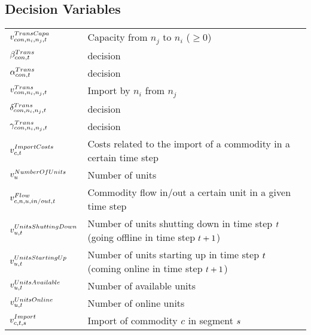 \subsection*{Decision Variables}
\vspace{-1em}
	\begin{longtable}{p{\cola} p{\colc} >{\small\raggedleft\arraybackslash\itshape}p{\colb}}
		$v^{TransCapa}_{{con},n_i,n_j,t}     $	& Capacity from $n_j$ to $n_i$  ($\geq 0$)                              	&                \\
		$\beta^{Trans}_{{con},t}            $	& decision                                                    	&                \\
		$\alpha^{Trans}_{{con},t}            $	& decision                                                    	&                \\
		$v^{Trans}_{{con},n_i,n_j,t}        $	& Import by $n_i$ from $n_j$                                  	&                \\
		$\delta^{Trans}_{{con},n_i,n_j,t}            $	& decision                                                    	&                \\
		$\gamma^{Trans}_{{con},n_i,n_j,t}            $	& decision                                                    	&                \\[0.5em]

		$v^{ImportCosts}_{c,t}  $	& Costs related to the import of a commodity in a certain time step	&                \\[0.5em]

		$v^{NumberOfUnits}_{u}$	& Number of units                                             	&                \\[0.5em]

		$v^{Flow}_{c,n, u,in/out,t}         $	& Commodity flow in/out a certain unit in a given time step   	&                \\
		$v^{UnitsShuttingDown}_{u,t}$	& Number of units shutting down in time step $t$ (going offline in time step $t +1$)	&                \\
		$v^{UnitsStartingUp}_{u,t}$	& Number of units starting up in time step $t$ (coming online in time step $t +1$)	&                \\
		$v^{UnitsAvailable}_{u,t}$	& Number of available units                                   	&                \\
		$v^{UnitsOnline}_{u,t}  $	& Number of online units                                      	&                \\
		$v^{Import}_{c,t,s}       $	& Import of commodity $c$ in segment $s$      	&                \\
	\end{longtable}
